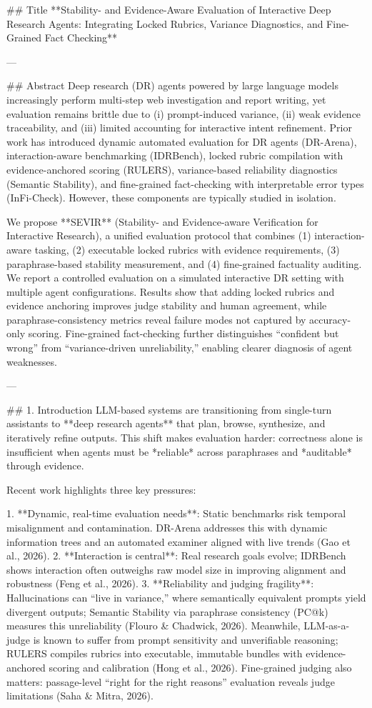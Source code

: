 ## Title  
**Stability- and Evidence-Aware Evaluation of Interactive Deep Research Agents: Integrating Locked Rubrics, Variance Diagnostics, and Fine-Grained Fact Checking**

---

## Abstract  
Deep research (DR) agents powered by large language models increasingly perform multi-step web investigation and report writing, yet evaluation remains brittle due to (i) prompt-induced variance, (ii) weak evidence traceability, and (iii) limited accounting for interactive intent refinement. Prior work has introduced dynamic automated evaluation for DR agents (DR-Arena), interaction-aware benchmarking (IDRBench), locked rubric compilation with evidence-anchored scoring (RULERS), variance-based reliability diagnostics (Semantic Stability), and fine-grained fact-checking with interpretable error types (InFi-Check). However, these components are typically studied in isolation.  

We propose **SEVIR** (Stability- and Evidence-aware Verification for Interactive Research), a unified evaluation protocol that combines (1) interaction-aware tasking, (2) executable locked rubrics with evidence requirements, (3) paraphrase-based stability measurement, and (4) fine-grained factuality auditing. We report a controlled evaluation on a simulated interactive DR setting with multiple agent configurations. Results show that adding locked rubrics and evidence anchoring improves judge stability and human agreement, while paraphrase-consistency metrics reveal failure modes not captured by accuracy-only scoring. Fine-grained fact-checking further distinguishes “confident but wrong” from “variance-driven unreliability,” enabling clearer diagnosis of agent weaknesses.

---

## 1. Introduction  
LLM-based systems are transitioning from single-turn assistants to **deep research agents** that plan, browse, synthesize, and iteratively refine outputs. This shift makes evaluation harder: correctness alone is insufficient when agents must be *reliable* across paraphrases and *auditable* through evidence.

Recent work highlights three key pressures:

1. **Dynamic, real-time evaluation needs**: Static benchmarks risk temporal misalignment and contamination. DR-Arena addresses this with dynamic information trees and an automated examiner aligned with live trends (Gao et al., 2026).  
2. **Interaction is central**: Real research goals evolve; IDRBench shows interaction often outweighs raw model size in improving alignment and robustness (Feng et al., 2026).  
3. **Reliability and judging fragility**: Hallucinations can “live in variance,” where semantically equivalent prompts yield divergent outputs; Semantic Stability via paraphrase consistency (PC@k) measures this unreliability (Flouro & Chadwick, 2026). Meanwhile, LLM-as-a-judge is known to suffer from prompt sensitivity and unverifiable reasoning; RULERS compiles rubrics into executable, immutable bundles with evidence-anchored scoring and calibration (Hong et al., 2026). Fine-grained judging also matters: passage-level “right for the right reasons” evaluation reveals judge limitations (Saha & Mitra, 2026).

